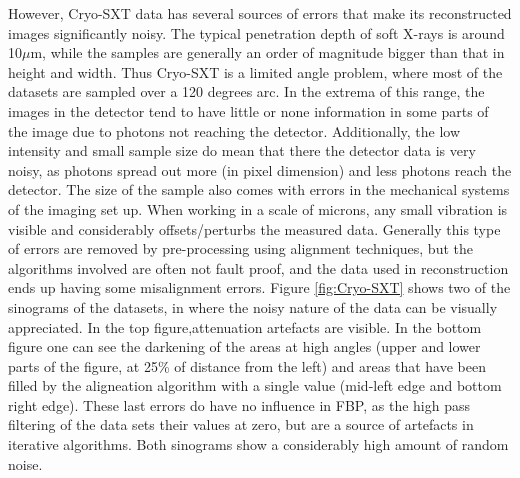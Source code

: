 However, Cryo-SXT data has several sources of errors that make its reconstructed images significantly noisy. The typical penetration depth of soft X-rays is around 10$\mu$m, while the samples are generally an order of magnitude bigger than that in height and width. Thus Cryo-SXT is a limited angle problem, where most of the datasets are sampled over a 120 degrees arc. In the extrema of this range, the images in the detector tend to have little or none information in some parts of the image due to photons not reaching the detector. Additionally, the low intensity and small sample size do mean that there the detector data is very noisy, as photons spread out more (in pixel dimension) and less photons reach the detector. The size of the sample also comes with errors in the mechanical systems of the imaging set up. When working in a scale of microns, any small vibration is visible and considerably offsets/perturbs the measured data. Generally this type of errors are removed by pre-processing using alignment techniques, but the algorithms involved are often not fault proof, and the data used in reconstruction ends up having some misalignment errors. Figure \ref{fig:Cryo-SXT} shows two of the sinograms of the datasets, in where the noisy nature of the data can be visually appreciated. In the top figure,attenuation artefacts are visible. In the bottom figure one can see the darkening of the areas at high angles (upper and lower parts of the figure, at 25\% of distance from the left) and areas that have been filled by the aligneation algorithm with a single value (mid-left edge and bottom right edge). These last errors do have no influence in FBP, as the high pass filtering of the data sets their values at zero, but are a source of artefacts in iterative algorithms. Both sinograms show a considerably high amount of random noise.

